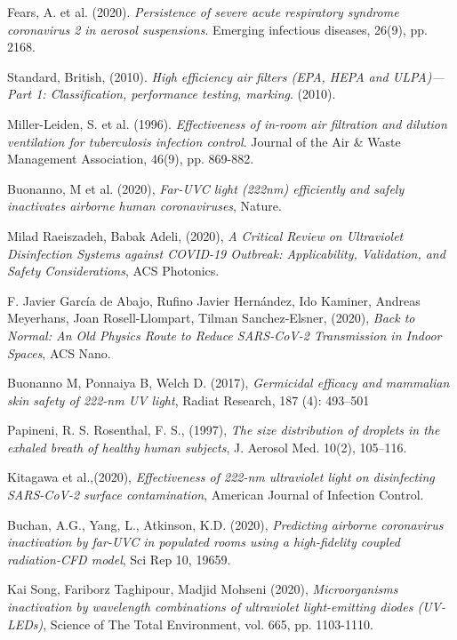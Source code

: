 \documentclass[11pt]{report}
\begin{document}
\begin{thebibliography}{1}
        Fears, A. et al. (2020). \emph{Persistence of severe acute respiratory syndrome coronavirus 2 in aerosol suspensions}. Emerging infectious diseases, 26(9), pp. 2168.

        Standard, British, (2010). \emph{High efficiency air filters (EPA, HEPA and ULPA)—Part 1: Classification, performance testing, marking}. (2010).

        Miller-Leiden, S. et al. (1996). \emph{Effectiveness of in-room air filtration and dilution ventilation for tuberculosis infection control}. Journal of the Air \& Waste Management Association, 46(9), pp. 869-882.
	
		
	
	Buonanno, M et al. (2020), \emph{Far-UVC light (222nm) efficiently and safely inactivates airborne human coronaviruses}, Nature.
    		
	Milad Raeiszadeh,  Babak Adeli, (2020), \emph{A Critical Review on Ultraviolet Disinfection Systems against COVID-19 Outbreak: Applicability, Validation, and Safety Considerations}, ACS Photonics.
		
	F. Javier García de Abajo, Rufino Javier Hernández, Ido Kaminer, Andreas Meyerhans, Joan Rosell-Llompart, Tilman Sanchez-Elsner, (2020), \emph{Back to Normal: An Old Physics Route to Reduce SARS-CoV-2 Transmission in Indoor Spaces}, ACS Nano.
		
	Buonanno M, Ponnaiya B, Welch D. (2017), \emph{Germicidal efficacy and mammalian skin safety of 222-nm UV light}, Radiat Research,  187 (4): 493–501
		
	Papineni, R. S.  Rosenthal, F. S., (1997), \emph{The size distribution of droplets in the exhaled breath of healthy human subjects}, J. Aerosol Med. 10(2), 105–116.
		
	Kitagawa et al.,(2020), \emph{Effectiveness of 222-nm ultraviolet light on disinfecting SARS-CoV-2 surface contamination}, American Journal of Infection Control.
		
	Buchan, A.G., Yang, L., Atkinson, K.D. (2020), \emph{Predicting airborne coronavirus inactivation by far-UVC in populated rooms using a high-fidelity coupled radiation-CFD model}, Sci Rep 10, 19659.
		
	Kai Song, Fariborz Taghipour, Madjid Mohseni (2020),  \emph{Microorganisms inactivation by wavelength combinations of ultraviolet light-emitting diodes (UV-LEDs)}, Science of The Total Environment, vol. 665, pp. 1103-1110.   
		

\end{thebibliography}
\end{document}
